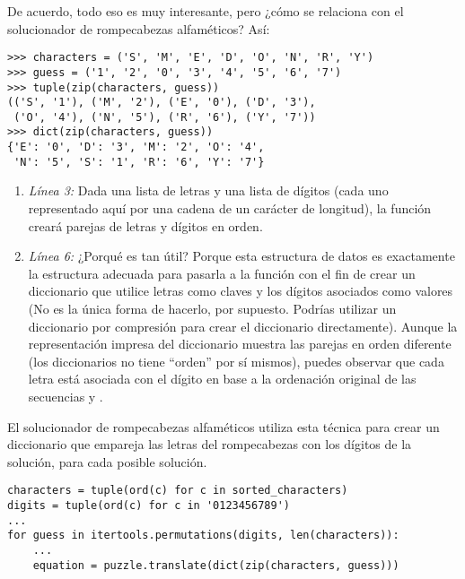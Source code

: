 De acuerdo, todo eso es muy interesante, pero ¿cómo se relaciona con el solucionador de rompecabezas alfaméticos? Así:

\noindent\begin{minipage}{\textwidth}
\begin{lstlisting}[mathescape=True]
>>> characters = ('S', 'M', 'E', 'D', 'O', 'N', 'R', 'Y')
>>> guess = ('1', '2', '0', '3', '4', '5', '6', '7')
>>> tuple(zip(characters, guess))
(('S', '1'), ('M', '2'), ('E', '0'), ('D', '3'),
 ('O', '4'), ('N', '5'), ('R', '6'), ('Y', '7'))
>>> dict(zip(characters, guess))
{'E': '0', 'D': '3', 'M': '2', 'O': '4',
 'N': '5', 'S': '1', 'R': '6', 'Y': '7'}
\end{lstlisting}
\end{minipage}

\begin{enumerate}

\item \emph{Línea 3:} Dada una lista de letras y una lista de dígitos (cada uno representado aquí por una cadena de un carácter de longitud), la función  creará parejas de letras y dígitos en orden.

\item \emph{Línea 6:} ¿Porqué es tan útil? Porque esta estructura de datos es exactamente la estructura adecuada para pasarla a la función  con el fin de crear un diccionario que utilice letras como claves y los dígitos asociados como valores (No es la única forma de hacerlo, por supuesto. Podrías utilizar un diccionario por compresión para crear el diccionario directamente). Aunque la representación impresa del diccionario muestra las parejas en orden diferente (los diccionarios no tiene ``orden'' por sí mismos), puedes observar que cada letra está asociada con el dígito en base a la ordenación original de las secuencias  y .

\end{enumerate}

El solucionador de rompecabezas alfaméticos utiliza esta técnica para crear un diccionario que empareja las letras del rompecabezas con los dígitos de la solución, para cada posible solución.

\noindent\begin{minipage}{\textwidth}
\begin{lstlisting}[mathescape=True]
characters = tuple(ord(c) for c in sorted_characters)
digits = tuple(ord(c) for c in '0123456789')
...
for guess in itertools.permutations(digits, len(characters)):
    ...
    equation = puzzle.translate(dict(zip(characters, guess)))
\end{lstlisting}
\end{minipage}

